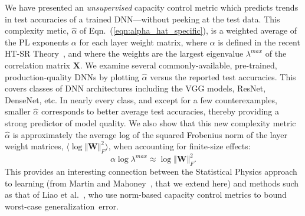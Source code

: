 {We have presented an \emph{unsupervised} capacity control metric which predicts trends in test accuracies of a trained DNN---without peeking at the test data. 
This complexity metic, $\hat{\alpha}$ of Eqn.~(\ref{eqn:alpha_hat_specific}), is a weighted average of the PL exponents $\alpha$ for each layer weight matrix, where $\alpha$ is defined in the recent HT-SR Theory~\cite{MM18_TR,MM19_HTSR_ICML}, and where the weights are the largest eigenvalue $\lambda^{max}$ of the correlation matrix $\mathbf{X}$.  
%
We examine several commonly-available, pre-trained, production-quality DNNs by plotting $\hat{\alpha}$ versus the reported test accuracies.
This covers classes of DNN architectures including the VGG models, ResNet, DenseNet, etc. 
In nearly every class, and except for a few counterexamples, smaller $\hat{\alpha}$ corresponds to better average test accuracies, thereby providing a strong predictor of model quality.
%
We also show that this new complexity metric $\hat{\alpha}$ is approximately the average log of the squared Frobenius norm of the layer weight matrices, $\langle\log\Vert\mathbf{W}\Vert_{F}^{2}\rangle$, when accounting for finite-size effects:
$$
 \alpha\log\lambda^{max}\approx\log\Vert\mathbf{W}\Vert^{2}_{F}  .
$$
This provides an interesting connection between the Statistical Physics approach to learning (from Martin and Mahoney~\cite{MM17_TR,MM18_TR,MM19_HTSR_ICML}, that we extend here) and methods such as that of Liao et al.~\cite{LMBx18_TR}, who use norm-based capacity control metrics to bound worst-case generalization~error.


}
